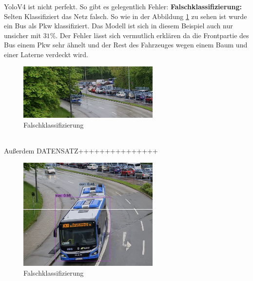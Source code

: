 \documentclass[conference]{IEEEtran}
\begin{document}
	YoloV4 ist nicht perfekt. So gibt es gelegentlich Fehler:
	\textbf{Falschklassifizierung:}\\
	Selten Klassifiziert das Netz falsch. So wie in der Abbildung \ref{FaK} zu sehen ist wurde ein Bus als Pkw klassifiziert. Das Modell ist sich in diesem Beispiel auch nur unsicher mit $31\%$. Der Fehler lässt sich vermutlich erklären da die Frontpartie des Bus einem Pkw sehr ähnelt und der Rest des Fahrzeuges wegen einem Baum und einer Laterne verdeckt wird.
	\begin{figure}[!h]
		\begin{center}
			\includegraphics[width=7cm]{Media/Output_480 - Kopie.jpg}
			\caption{Falschklassifizierung}
			\label{FaK}
		\end{center}
	\end{figure}\\
	Außerdem DATENSATZ+++++++++++++++
	\begin{figure}[!h]
		\begin{center}
			\includegraphics[width=7cm]{Media/Output_847 - Kopie.jpg}
			\caption{Falschklassifizierung}
			\label{FaK2}
		\end{center}
	\end{figure}\\
\end{document}
